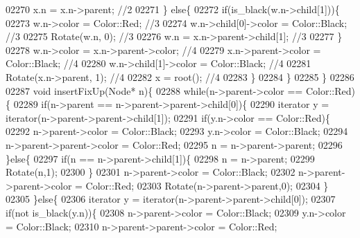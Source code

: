 \begin{DoxyCode}
02270                 x.n = x.n->parent;                                      \textcolor{comment}{//2}
02271             \} \textcolor{keywordflow}{else}\{
02272                 \textcolor{keywordflow}{if}(is\_black(w.n->child[1]))\{
02273                     w.n->color = Color::Red;                    \textcolor{comment}{//3}
02274                     w.n->child[0]->color = Color::Black;        \textcolor{comment}{//3}
02275                     Rotate(w.n, 0);                             \textcolor{comment}{//3}
02276                     w.n = x.n->parent->child[1];                \textcolor{comment}{//3}
02277                 \}
02278                 w.n->color = x.n->parent->color;                    \textcolor{comment}{//4}
02279                 x.n->parent->color = Color::Black;                  \textcolor{comment}{//4}
02280                 w.n->child[1]->color = Color::Black;                \textcolor{comment}{//4}
02281                 Rotate(x.n->parent, 1);                             \textcolor{comment}{//4}
02282                 x = root();                                         \textcolor{comment}{//4}
02283             \}
02284         \}
02285     \}
02286 
02287     \textcolor{keywordtype}{void} insertFixUp(Node* n)\{
02288         \textcolor{keywordflow}{while}(n->parent->color == Color::Red)\{
02289             \textcolor{keywordflow}{if}(n->parent == n->parent->parent->child[0])\{
02290                 iterator y = iterator(n->parent->parent->child[1]);
02291                 \textcolor{keywordflow}{if}(y.n->color == Color::Red)\{
02292                     n->parent->color = Color::Black;
02293                     y.n->color = Color::Black;
02294                     n->parent->parent->color = Color::Red;
02295                     n = n->parent->parent;
02296                 \}\textcolor{keywordflow}{else}\{
02297                     \textcolor{keywordflow}{if}(n == n->parent->child[1])\{
02298                         n = n->parent;
02299                         Rotate(n,1);
02300                     \}
02301                     n->parent->color = Color::Black;
02302                     n->parent->parent->color = Color::Red;
02303                     Rotate(n->parent->parent,0);
02304                 \}
02305             \}\textcolor{keywordflow}{else}\{
02306                 iterator y = iterator(n->parent->parent->child[0]);
02307                 \textcolor{keywordflow}{if}(not is\_black(y.n))\{
02308                     n->parent->color = Color::Black;
02309                     y.n->color = Color::Black;
02310                     n->parent->parent->color = Color::Red;

\end{DoxyCode}
